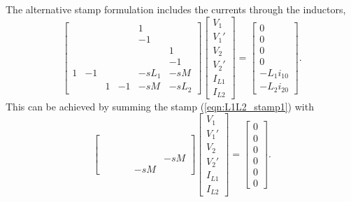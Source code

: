 \documentclass[a4paper, 12pt]{article}
\newcommand{\refeqn}[1]{\mbox{(\ref{eqn:#1})}}
\begin{document}
The alternative stamp formulation includes the currents through the
inductors,
%
\begin{equation}
  \begin{bmatrix}
     &  &  &    &  1 & \\
     &  &  &    & -1 & \\
     &  &  &    &    & 1\\
     &  &  &    &    & -1\\
1 & -1  &  &    & -sL_1 & -sM\\
     &  & 1 & -1 & -sM & -sL_2
  \end{bmatrix}
  \begin{bmatrix}
    V_1 \\ V_1' \\ V_2 \\ V_2' \\ I_{L1} \\ I_{L2}
  \end{bmatrix}
=
\begin{bmatrix}
  0 \\ 0 \\ 0 \\ 0 \\ -L_1 i_{10} \\ -L_2 i_{20}
\end{bmatrix}.
\end{equation}
%
This can be achieved by summing the stamp \refeqn{L1L2_stamp1} with
%
\begin{equation}
  \begin{bmatrix}
     &  &  &    &    & \\
     &  &  &    &    & \\
     &  &  &    &    & \\
     &  &  &    &    & \\
     &  &  &    &    & -sM\\
     &  &  &    & -sM &
  \end{bmatrix}
  \begin{bmatrix}
    V_1 \\ V_1' \\ V_2 \\ V_2' \\ I_{L1} \\ I_{L2}
  \end{bmatrix}
=
\begin{bmatrix}
  0 \\ 0 \\ 0 \\ 0 \\ 0 \\ 0
\end{bmatrix}.
\end{equation}
\end{document}

